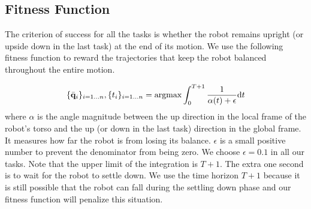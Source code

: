 
\subsection{Fitness Function}
The criterion of success for all the tasks is whether the robot remains upright (or upside down in the last task) at the end of its motion. We use the following fitness function to reward the trajectories that keep the robot balanced throughout the entire motion.

\begin{equation}
  \{\bar{\mathbf{q}}_i\}_{i=1...n}, \{{t}_i\}_{i=1...n}=\argmax\int_0^{T+1} \frac{1}{\alpha(t)+\epsilon}\mathrm{d}t
  \label{eqn:controllerObj}
\end{equation}
where $\alpha$ is the angle magnitude between the up direction in the local frame of the robot's torso and the up (or down in the last task) direction in the global frame. It measures how far the robot is from losing its balance. $\epsilon$ is a small positive number to prevent the denominator from being zero. We choose $\epsilon=0.1$ in all our tasks. Note that the upper limit of the integration is $T+1$. The extra one second is to wait for the robot to settle down. We use the time horizon $T+1$ because it is still possible that the robot can fall during the settling down phase and our fitness function will penalize this situation.

